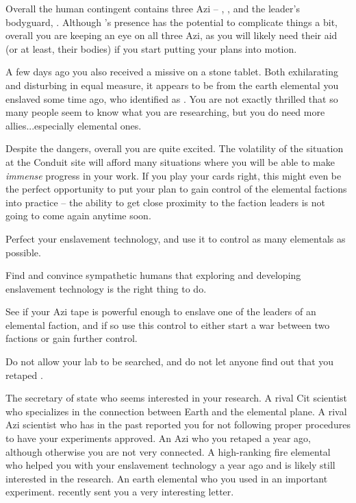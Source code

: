 \documentclass[char]{elementals}
\begin{document}
Overall the human contingent contains three Azi -- \cDiplomat{}, \cScientist{}, and the leader's bodyguard, \cRomeo{\intro}. Although \cDiplomat{}'s presence has the potential to complicate things a bit, overall you are keeping an eye on all three Azi, as you will likely need their aid (or at least, their bodies) if you start putting your plans into motion.

A few days ago you also received a missive on a stone tablet. Both exhilarating and disturbing in equal measure, it appears to be from the earth elemental you enslaved some time ago, who identified \cMinion{\themself} as \cMinion{\intro}. You are not exactly thrilled that so many people seem to know what you are researching, but you do need more allies...especially elemental ones.

Despite the dangers, overall you are quite excited. The volatility of the situation at the Conduit site will afford many situations where you will be able to make \emph{immense} progress in your work. If you play your cards right, this might even be the perfect opportunity to put your plan to gain control of the elemental factions into practice -- the ability to get close proximity to the faction leaders is not going to come again anytime soon.

\begin{itemz}[Goals]
  \item Perfect your enslavement technology, and use it to control as many elementals as possible.
  \item Find and convince sympathetic humans that exploring and developing enslavement technology is the right thing to do.
  \item See if your Azi tape is powerful enough to enslave one of the leaders of an elemental faction, and if so use this control to either start a war between two factions or gain further control.
  \item Do not allow your lab to be searched, and do not let anyone find out that you retaped \cDiplomat{}.
\end{itemz}

\begin{contacts}
  \contact{\cDema{}} The secretary of state who seems interested in your research.
	\contact{\cGD{}} A rival Cit scientist who specializes in the connection between Earth and the elemental plane.
	\contact{\cScientist{}} A rival Azi scientist who has in the past reported you for not following proper procedures to have your experiments approved.
	\contact{\cDiplomat{}} An Azi who you retaped a year ago, although otherwise you are not very connected.
	\contact{\cPyro{}} A high-ranking fire elemental who helped you with your enslavement technology a year ago and is likely still interested in the research.
	\contact{\cMinion{}} An earth elemental who you used in an important experiment. \cMinion{\They} recently sent you a very interesting letter.
\end{contacts}
\end{document}
